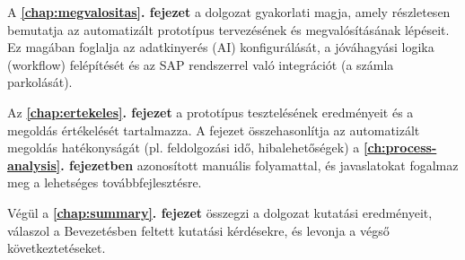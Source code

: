A \textbf{\ref{chap:megvalositas}. fejezet} a dolgozat gyakorlati magja, amely részletesen bemutatja az automatizált prototípus tervezésének és megvalósításának lépéseit.
Ez magában foglalja az adatkinyerés (AI) konfigurálását, a jóváhagyási logika (workflow) felépítését és az SAP rendszerrel való integrációt (a számla parkolását).

Az \textbf{\ref{chap:ertekeles}. fejezet} a prototípus tesztelésének eredményeit és a megoldás értékelését tartalmazza.
A fejezet összehasonlítja az automatizált megoldás hatékonyságát (pl. feldolgozási idő, hibalehetőségek) a \textbf{\ref{ch:process-analysis}. fejezetben} azonosított manuális folyamattal, és javaslatokat fogalmaz meg a lehetséges továbbfejlesztésre.

Végül a \textbf{\ref{chap:summary}. fejezet} összegzi a dolgozat kutatási eredményeit, válaszol a Bevezetésben feltett kutatási kérdésekre, és levonja a végső következtetéseket.